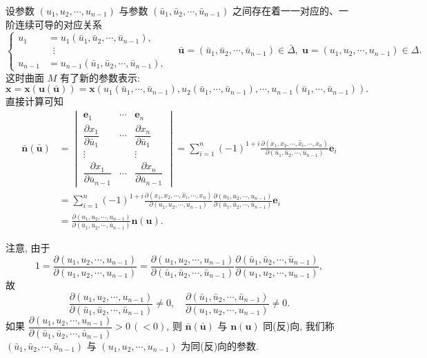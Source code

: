 \begin{example}
设参数 $(u_{1}, u_{2}, \cdots, u_{n-1})$ 与参数 $(\bar{u}_{1}, \bar{u}_{2}, \cdots, \bar{u}_{n-1})$ 之间存在着一一对应的、一阶连续可导的对应关系
\[
  \left\{\begin{aligned}
    u_{1} &= u_{1}(\bar{u}_{1}, \bar{u}_{2}, \cdots, \bar{u}_{n-1}), \\
    &\;\;\vdots \\
    u_{n-1} &= u_{n-1}(\bar{u}_{1}, \bar{u}_{2}, \cdots, \bar{u}_{n-1}),
  \end{aligned}\right. \quad \bar{\boldsymbol{u}} = (\bar{u}_{1}, \bar{u}_{2}, \cdots, \bar{u}_{n-1}) \in \bar{\Delta}, \; \boldsymbol{u} = (u_{1}, u_{2}, \cdots, u_{n-1}) \in \Delta.
\]
这时曲面 $M$ 有了新的参数表示:
\[
  \boldsymbol{x} = \boldsymbol{x}(\boldsymbol{u}(\bar{\boldsymbol{u}})) = \boldsymbol{x}(u_{1}(\bar{u}_{1}, \cdots, \bar{u}_{n-1}), u_{2}(\bar{u}_{1}, \cdots, \bar{u}_{n-1}), \cdots, u_{n-1}(\bar{u}_{1}, \cdots, \bar{u}_{n-1})).
\]
直接计算可知
\begin{align*}
  \bar{\boldsymbol{n}}(\bar{\boldsymbol{u}}) &= \begin{vmatrix}
    \boldsymbol{e}_{1} & \cdots & \boldsymbol{e}_{n} \\
    \dfrac{\partial x_{1}}{\partial\bar{u}_{1}} & \cdots & \dfrac{\partial x_{n}}{\partial\bar{u}_{1}} \\
    \vdots & & \vdots \\
    \dfrac{\partial x_{1}}{\partial\bar{u}_{n-1}} & \cdots & \dfrac{\partial x_{n}}{\partial\bar{u}_{n-1}}
  \end{vmatrix} = \sum_{i=1}^{n}(-1)^{1+i}\frac{\partial(x_{1}, x_{2}, \cdots, \hat{x}_{i}, \cdots, x_{n})}{\partial(\bar{u}_{1}, \bar{u}_{2}, \cdots, \bar{u}_{n-1})}\boldsymbol{e}_{i} \\
  &= \sum_{i=1}^{n}(-1)^{1+i}\frac{\partial(x_{1}, x_{2}, \cdots, \hat{x}_{i}, \cdots, x_{n})}{\partial(u_{1}, u_{2}, \cdots, u_{n-1})}\frac{\partial(u_{1}, u_{2}, \cdots, u_{n-1})}{\partial(\bar{u}_{1}, \bar{u}_{2}, \cdots, \bar{u}_{n-1})}\boldsymbol{e}_{i} \\
  &= \frac{\partial(u_{1}, u_{2}, \cdots, u_{n-1})}{\partial(\bar{u}_{1}, \bar{u}_{2}, \cdots, \bar{u}_{n-1})}\boldsymbol{n}(\boldsymbol{u}).
\end{align*}
\end{example}

注意, 由于
\[
  1 = \frac{\partial(u_{1}, u_{2}, \cdots, u_{n-1})}{\partial(u_{1}, u_{2}, \cdots, u_{n-1})} = \frac{\partial(u_{1}, u_{2}, \cdots, u_{n-1})}{\partial(\bar{u}_{1}, \bar{u}_{2}, \cdots, \bar{u}_{n-1})}\frac{\partial(\bar{u}_{1}, \bar{u}_{2}, \cdots, \bar{u}_{n-1})}{\partial(u_{1}, u_{2}, \cdots, u_{n-1})},
\]
故
\[
  \frac{\partial(u_{1}, u_{2}, \cdots, u_{n-1})}{\partial(\bar{u}_{1}, \bar{u}_{2}, \cdots, \bar{u}_{n-1})} \neq 0, \quad \frac{\partial(\bar{u}_{1}, \bar{u}_{2}, \cdots, \bar{u}_{n-1})}{\partial(u_{1}, u_{2}, \cdots, u_{n-1})} \neq 0.
\]
如果 $\dfrac{\partial(u_{1}, u_{2}, \cdots, u_{n-1})}{\partial(\bar{u}_{1}, \bar{u}_{2}, \cdots, \bar{u}_{n-1})} > 0\,(< 0)$, 则 $\bar{\boldsymbol{n}}(\bar{\boldsymbol{u}})$ 与 $\boldsymbol{n}(\boldsymbol{u})$ 同(反)向, 我们称 $(\bar{u}_{1}, \bar{u}_{2}, \cdots, \bar{u}_{n-1})$ 与 $(u_{1}, u_{2}, \cdots, u_{n-1})$ 为同(反)向的参数.

